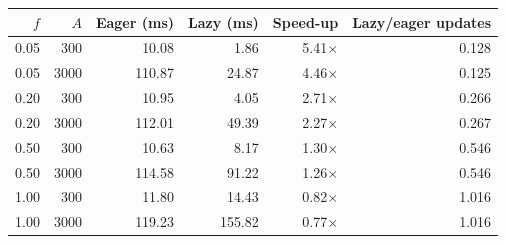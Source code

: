 \begin{tabular}{@{}rrrrrr@{}}
\toprule
$f$ & $A$ & Eager (ms) & Lazy (ms) & Speed-up & Lazy/eager updates \\
\midrule
0.05 & 300 & 10.08 & 1.86 & 5.41$\times$ & 0.128 \\
0.05 & 3000 & 110.87 & 24.87 & 4.46$\times$ & 0.125 \\
0.20 & 300 & 10.95 & 4.05 & 2.71$\times$ & 0.266 \\
0.20 & 3000 & 112.01 & 49.39 & 2.27$\times$ & 0.267 \\
0.50 & 300 & 10.63 & 8.17 & 1.30$\times$ & 0.546 \\
0.50 & 3000 & 114.58 & 91.22 & 1.26$\times$ & 0.546 \\
1.00 & 300 & 11.80 & 14.43 & 0.82$\times$ & 1.016 \\
1.00 & 3000 & 119.23 & 155.82 & 0.77$\times$ & 1.016 \\
\bottomrule
\end{tabular}
